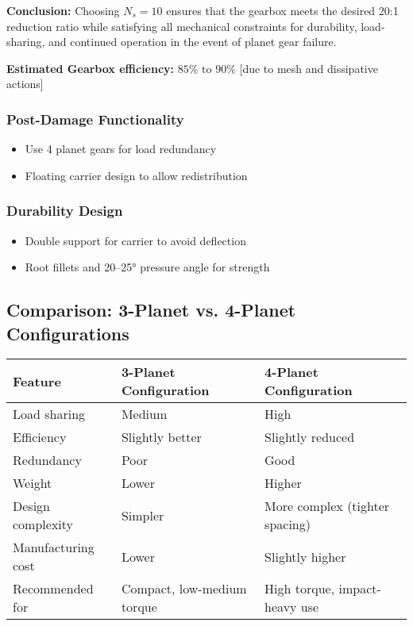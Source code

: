 \documentclass[a4paper,12pt]{article}
\begin{document}
\textbf{Conclusion:} Choosing \( N_s = 10 \) ensures that the gearbox meets the desired 20:1 reduction ratio while satisfying all mechanical constraints for durability, load-sharing, and continued operation in the event of planet gear failure.


\textbf{Estimated Gearbox efficiency:} \(85\%\text{ to }90\%\) [due to mesh and dissipative actions]

\subsubsection*{Post-Damage Functionality}
\begin{itemize}
    \item Use 4 planet gears for load redundancy
    \item Floating carrier design to allow redistribution
\end{itemize}

\subsubsection*{Durability Design}
\begin{itemize}
    \item Double support for carrier to avoid deflection
    \item Root fillets and 20--25° pressure angle for strength
\end{itemize}

                    \subsection*{Comparison: 3-Planet vs. 4-Planet Configurations}
\begin{table}[h!]
\centering
\begin{tabular}{@{}p{4.5cm}p{4.5cm}p{4.5cm}@{}}
\toprule
\textbf{Feature} & \textbf{3-Planet Configuration} & \textbf{4-Planet Configuration} \\ \midrule
Load sharing & Medium & High \\
Efficiency & Slightly better & Slightly reduced \\
Redundancy & Poor & Good \\
Weight & Lower & Higher \\
Design complexity & Simpler & More complex (tighter spacing) \\
Manufacturing cost & Lower & Slightly higher \\
Recommended for & Compact, low-medium torque & High torque, impact-heavy use \\ 
\bottomrule
\end{tabular}

\end{table}
\end{document}
